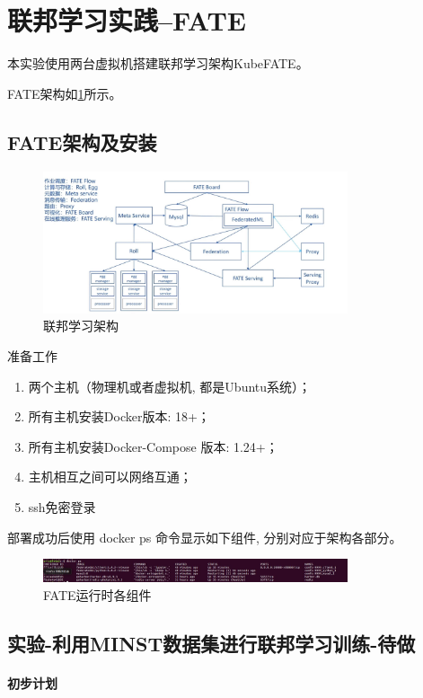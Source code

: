 \documentclass[a4paper]{article}
\begin{document}
\section{联邦学习实践--FATE}
本实验使用两台虚拟机搭建联邦学习架构KubeFATE。

FATE架构如\ref{fate_architecture}所示。
\subsection{FATE架构及安装}
\begin{figure}[htb]
    \center
\includegraphics[width=0.8\textwidth]{fate1.jpg}
\caption{联邦学习架构}
\label{fate_architecture}
\end{figure}

准备工作
\begin{enumerate}
    \item 两个主机（物理机或者虚拟机, 都是Ubuntu系统）；
    \item 所有主机安装Docker版本: 18+；
    \item 所有主机安装Docker-Compose 版本: 1.24+；
    \item 主机相互之间可以网络互通；
    \item ssh免密登录
\end{enumerate}
部署成功后使用 docker ps 命令显示如下组件, 分别对应于架构各部分。
\begin{figure}[!ht]
    \center
\includegraphics[width=0.8\textwidth]{fate_success.jpg}
\caption{FATE运行时各组件}
\end{figure}

\subsection{实验-利用MINST数据集进行联邦学习训练-待做}

\paragraph{初步计划}
\end{document}

